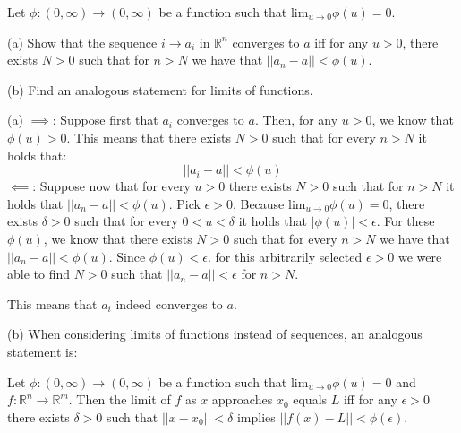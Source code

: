\begin{exercise}{11}
    Let $\phi:(0, \infty) \rightarrow (0, \infty)$ be a function such that $\text{lim}_{u \rightarrow 0} \phi(u) = 0$.

    (a) Show that the sequence $i \rightarrow a_i$ in $\mathbb{R}^n$ converges to $a$ iff for any $u > 0$, there exists $N > 0$ such that for $n > N$ we have that $\lvert \lvert a_n - a \rvert \rvert < \phi(u)$.

    (b) Find an analogous statement for limits of functions.
\end{exercise}

\begin{solution}

    (a) $\implies$: Suppose first that $a_i$ converges to $a$. Then, for any $u > 0$, we know that $\phi(u) > 0$. This means that there exists $N > 0$ such that for every $n > N$ it holds that:
    $$\lvert \lvert a_i - a \rvert \rvert < \phi(u)$$
    $\impliedby$: Suppose now that for every $u > 0$ there exists $N > 0$ such that for $n > N$ it holds that $\lvert \lvert a_n - a \rvert \rvert < \phi(u)$. Pick $\epsilon > 0$. Because $\text{lim}_{u\rightarrow 0}\phi(u) = 0$, there exists $\delta > 0$ such that for every $0 < u < \delta$ it holds that $\lvert \phi(u) \rvert < \epsilon$. For these $\phi(u)$, we know that there exists $N > 0$ such that for every $n > N$ we have that $\lvert \lvert a_n - a \rvert \rvert < \phi(u)$. Since $\phi(u) < \epsilon$. for this arbitrarily selected $\epsilon > 0$ we were able to find $N > 0$ such that $\lvert \lvert a_n - a \rvert \rvert < \epsilon$ for $n > N$.

    This means that $a_i$ indeed converges to $a$.

    (b) When considering limits of functions instead of sequences, an analogous statement is:

    Let $\phi:(0, \infty) \rightarrow (0, \infty)$ be a function such that $\text{lim}_{u\rightarrow 0} \phi(u) = 0$ and $f: \mathbb{R}^n \rightarrow \mathbb{R}^m$. Then the limit of $f$ as $x$ approaches $x_0$ equals $L$ iff for any $\epsilon > 0$ there exists $\delta > 0$ such that $\lvert \lvert x - x_0 \rvert \rvert < \delta$ implies $\lvert \lvert f(x) - L \rvert \rvert < \phi(\epsilon)$.
\end{solution}


